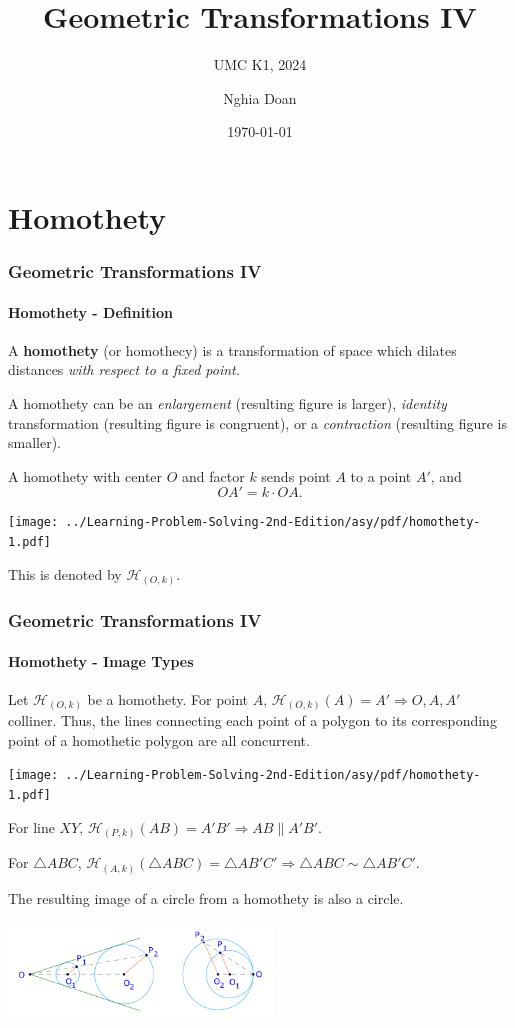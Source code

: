 \documentclass[8pt,xcolor=table,dvipsnames]{beamer}
\title{Geometric Transformations IV}
\subtitle{UMC K1, 2024}
\author{Nghia Doan}
\institute{MCC Club \& Competitions}
\date{\today}
\begin{document}
\section{Homothety}

\begin{frame}[t]
    \frametitle{Geometric Transformations IV}
    \framesubtitle{Homothety - Definition}
    A \textbf{homothety} (or homothecy) is a transformation of space
    which dilates distances \textit{with respect to a fixed point.}

    \bigbreak
    A homothety can be an \textit{enlargement} (resulting figure is larger),
    \textit{identity} transformation (resulting figure is congruent),
    or a \textit{contraction} (resulting figure is smaller).

    \bigbreak
    A homothety with center $O$ and factor $k$ sends point $A$ to a point $A'$, and
    \[
        OA'= k\cdot OA.
    \]
    \begin{center}
        \texttt{[image: ../Learning-Problem-Solving-2nd-Edition/asy/pdf/homothety-1.pdf]}
    \end{center}
    This is denoted by $\mathcal{H}_{(O, k)}$.
\end{frame}

\begin{frame}[t]
    \frametitle{Geometric Transformations IV}
    \framesubtitle{Homothety - Image Types}
    \begin{overprint}
        Let $\mathcal{H}_{(O, k)}$ be a homothety.
        For point $A$, $\mathcal{H}_{(O, k)}(A) = A' \Rightarrow O,A,A'$ colliner.
        Thus, the lines connecting each point of a polygon  to its corresponding point of a homothetic polygon
        are all concurrent.
        \begin{center}
            \texttt{[image: ../Learning-Problem-Solving-2nd-Edition/asy/pdf/homothety-1.pdf]}
        \end{center}
        For line $XY$, $\mathcal{H}_{(P, k)}(AB) = A'B' \Rightarrow AB \parallel A'B'.$

        For $\triangle ABC$, $\mathcal{H}_{(A, k)}(\triangle ABC) = \triangle AB'C' \Rightarrow \triangle ABC \sim \triangle AB'C'.$

        The resulting image of a circle from a homothety is also a circle.
        \begin{center}
            \includegraphics[width=7cm]{./svg/pdf/homothety-circles.pdf}
        \end{center}
    \end{overprint}
\end{frame}
\end{document}
